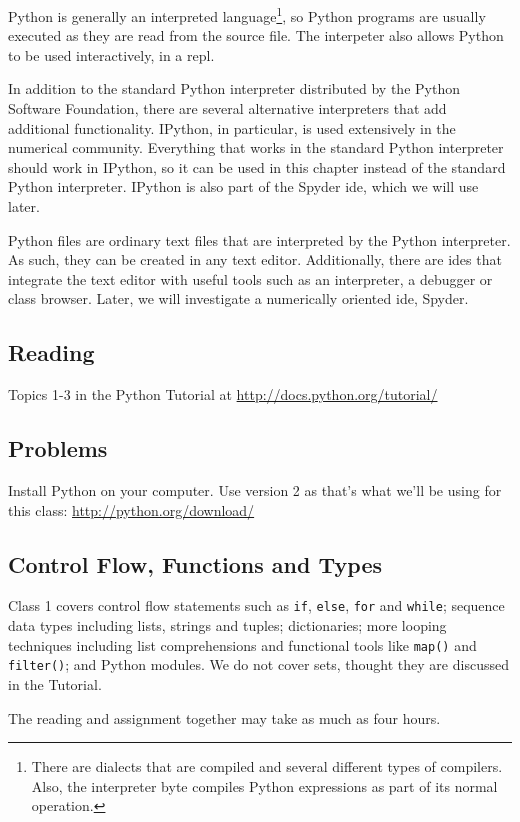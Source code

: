 \documentclass{report}
\begin{document}
Python is generally an interpreted language\footnote{There are dialects that are compiled and several different types of compilers. Also, the interpreter byte compiles Python expressions as part of its normal operation.}, so Python programs are usually executed as they are read from the source file. The interpeter also allows Python to be used interactively, in a \gls{repl}. 

In addition to the standard Python interpreter distributed by the Python Software Foundation, there are several alternative interpreters that add additional functionality. IPython, in particular, is used extensively in the numerical community. Everything that works in the standard Python interpreter should work in IPython, so it can be used in this chapter instead of the standard Python interpreter. IPython is also part of the Spyder \gls{ide}, which we will use later.

Python files are ordinary text files that are interpreted by the Python interpreter.  As such, they can be created in any text editor. Additionally, there are \glspl{ide} that integrate the text editor with useful tools such as an interpreter, a debugger or class browser. Later, we will investigate a numerically oriented \gls{ide}, Spyder. 

\subsection{Reading}
Topics 1-3 in the Python Tutorial at \url{http://docs.python.org/tutorial/} \cite{website:Python272docs}
\subsection{Problems}
Install Python on your computer. Use version 2 as that's what we'll be using for this class: \url{http://python.org/download/}

\subsection{Control Flow, Functions and Types}
Class 1 covers control flow statements such as \verb|if|, \verb|else|, \verb|for| and \verb|while|; sequence data types including lists, strings and tuples; dictionaries; more looping techniques including list comprehensions and functional tools like \verb|map()| and \verb|filter()|; and Python modules. We do not cover sets, thought they are discussed in the Tutorial.

The reading and assignment together may take as much as four hours.
\end{document}
